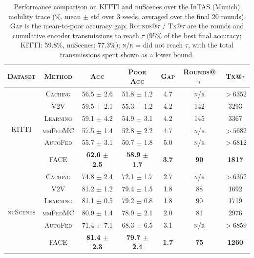\begin{table}[t]
    \centering
    \caption{Performance comparison on KITTI and nuScenes over the InTAS (Munich) mobility trace (\%, mean $\pm$ std over 3 seeds, averaged over the final 20 rounds). \textsc{Gap} is the mean-to-poor accuracy gap; \textsc{Rounds@$\tau$} / \textsc{Tx@$\tau$} are the rounds and cumulative encoder transmissions to reach $\tau$ (95\% of the best final accuracy; KITTI: 59.8\%, nuScenes: 77.3\%); \textsc{n/r} = did not reach $\tau$, with the total transmissions spent shown as a lower bound.}
    \label{tab:real_dataset_results}
    \renewcommand{\arraystretch}{1.15}
    \setlength{\tabcolsep}{5pt}
    \begin{tabular}{c|c|c|c|c|c|c}
        \hline
        \textsc{Dataset} & \textsc{Method} & \textsc{Acc} & \textsc{Poor Acc} & \textsc{Gap} & \textsc{Rounds@$\tau$} & \textsc{Tx@$\tau$} \\
        \hline
        \multirow{6}{*}{\textsc{KITTI}}
        & \textsc{Caching} & 56.5 $\pm$ 2.6 & 51.8 $\pm$ 1.2 & 4.7 & \textsc{n/r} & $>6352$ \\
        & \textsc{V2V} & 59.5 $\pm$ 2.1 & 55.3 $\pm$ 1.2 & 4.2 & 142 & 3293 \\
        & \textsc{Learning} & 59.1 $\pm$ 4.2 & 54.9 $\pm$ 3.1 & 4.2 & 145 & 3367 \\
        \cline{2-7}
        & \textsc{mmFedMC} & 57.5 $\pm$ 1.4 & 52.8 $\pm$ 2.2 & 4.7 & \textsc{n/r} & $>5682$ \\
        & \textsc{AutoFed} & 55.7 $\pm$ 3.1 & 50.7 $\pm$ 1.8 & 5.0 & \textsc{n/r} & $>6812$ \\
        \cline{2-7}
        & \textsc{FACE} & \textbf{62.6 $\pm$ 2.5} & \textbf{58.9 $\pm$ 1.7} & \textbf{3.7} & \textbf{90} & \textbf{1817} \\
        \hline
        \multirow{6}{*}{\textsc{nuScenes}}
        & \textsc{Caching} & 74.8 $\pm$ 2.4 & 72.1 $\pm$ 1.7 & 2.7 & \textsc{n/r} & $>6352$ \\
        & \textsc{V2V} & 81.2 $\pm$ 1.2 & 79.4 $\pm$ 1.5 & 1.8 & 88 & 1692 \\
        & \textsc{Learning} & 81.1 $\pm$ 0.5 & 79.2 $\pm$ 0.8 & 1.8 & 90 & 1719 \\
        \cline{2-7}
        & \textsc{mmFedMC} & 80.9 $\pm$ 1.4 & 78.9 $\pm$ 2.1 & 2.0 & 81 & 2976 \\
        & \textsc{AutoFed} & 71.4 $\pm$ 7.1 & 68.3 $\pm$ 6.5 & 3.1 & \textsc{n/r} & $>6859$ \\
        \cline{2-7}
        & \textsc{FACE} & \textbf{81.4 $\pm$ 2.3} & \textbf{79.7 $\pm$ 2.4} & \textbf{1.7} & \textbf{75} & \textbf{1260} \\
        \hline
    \end{tabular}
\end{table}
